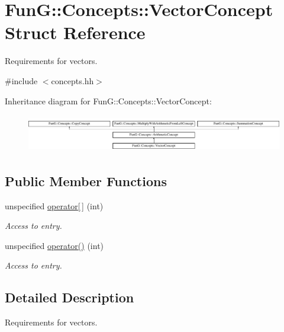 \hypertarget{structFunG_1_1Concepts_1_1VectorConcept}{}\section{Fun\+G\+:\+:Concepts\+:\+:Vector\+Concept Struct Reference}
\label{structFunG_1_1Concepts_1_1VectorConcept}


Requirements for vectors.  




{\ttfamily \#include $<$concepts.\+hh$>$}

Inheritance diagram for Fun\+G\+:\+:Concepts\+:\+:Vector\+Concept\+:\begin{figure}[H]
\begin{center}
\leavevmode
\includegraphics[height=1.661721cm]{structFunG_1_1Concepts_1_1VectorConcept}
\end{center}
\end{figure}
\subsection*{Public Member Functions}
\begin{DoxyCompactItemize}
\item 
unspecified \hyperlink{structFunG_1_1Concepts_1_1VectorConcept_a43c32ede7adc0131b68685ce5fe2bc66}{operator\mbox{[}$\,$\mbox{]}} (int)
\begin{DoxyCompactList}\small\item\em Access to entry. \end{DoxyCompactList}\item 
unspecified \hyperlink{structFunG_1_1Concepts_1_1VectorConcept_a01dc6bda9b67aeaf1e18bfd38749d51c}{operator()} (int)
\begin{DoxyCompactList}\small\item\em Access to entry. \end{DoxyCompactList}\end{DoxyCompactItemize}


\subsection{Detailed Description}
Requirements for vectors. 


